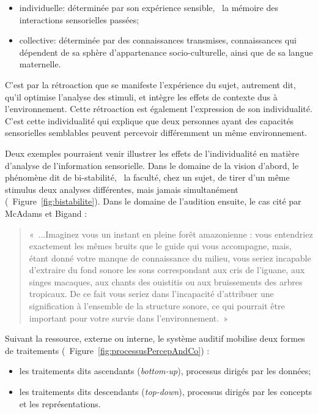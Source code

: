 \begin{itemize}
\item individuelle: déterminée par son expérience sensible, \ie~la mémoire des interactions sensorielles passées;
\item collective: déterminée par des connaissances transmises, connaissances qui dépendent de sa sphère d'appartenance socio-culturelle, ainsi que de sa langue maternelle.
\end{itemize}

C'est par la rétroaction que se manifeste l'expérience du sujet, autrement dit, qu'il optimise l'analyse des stimuli, et intègre les effets de contexte dus à l'environnement. Cette rétroaction est également l'expression de son individualité. C'est cette individualité qui explique que deux personnes ayant des capacités sensorielles semblables peuvent percevoir différemment un même environnement. 

Deux exemples pourraient venir illustrer les effets de l'individualité en matière d'analyse de l'information sensorielle. Dans le domaine de la vision d'abord, le phénomène dit de bi-stabilité, \ie~la faculté, chez un sujet, de tirer d'un même stimulus deux analyses différentes, mais jamais simultanément \citep{schwartz2012multistability} (\cf~Figure~\ref{fig:bistabilite}). Dans le domaine de l'audition ensuite, le cas cité par McAdams et Bigand \citep[p. 2]{mcadams1994penser}:

\begin{quote}
«~...Imaginez vous un instant en pleine forêt amazonienne : vous entendriez exactement les mêmes bruits que le guide qui vous accompagne, mais, étant donné votre manque de connaissance du milieu, vous seriez incapable d'extraire du fond sonore les sons correspondant aux cris de l'iguane, aux singes macaques, aux chants des ouistitis ou aux bruissements des arbres tropicaux. De ce fait vous seriez dans l'incapacité d'attribuer une signification à l'ensemble de la structure sonore, ce qui pourrait être important pour votre survie dans l'environnement.~»
\end{quote}


Suivant la ressource, externe ou interne, le système auditif mobilise deux formes de traitements (\cf~Figure~\ref{fig:processusPercepAndCo}) :

\begin{itemize}
\item les traitements dits ascendants (\emph{bottom-up}), processus dirigés par les données;
\item les traitements dits descendants (\emph{top-down}), processus dirigés par les concepts et les représentations.
\end{itemize}

